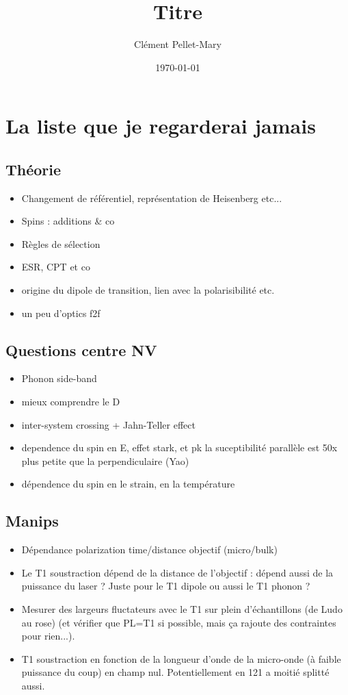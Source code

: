 \documentclass[a4paper]{report}
\title{Titre}
\author{Clément Pellet-Mary}
\date\today
\begin{document}
\chapter{La liste que je regarderai jamais}
  \section{Théorie}
  \begin{itemize}
  \item Changement de référentiel, représentation de Heisenberg etc...
  \item Spins : additions \& co
  \item Règles de sélection
  \item ESR, CPT et co
  \item origine du dipole de transition, lien avec la polarisibilité etc.
  \item un peu d'optics f2f
  \end{itemize}
  \section{Questions centre NV}
  \begin{itemize}
  \item Phonon side-band
  \item mieux comprendre le D
  \item inter-system crossing + Jahn-Teller effect
  \item dependence du spin en E, effet stark, et pk la suceptibilité parallèle est 50x plus petite que la perpendiculaire (Yao)
  \item dépendence du spin en le strain, en la température
  \end{itemize}
 
 \section{Manips}
 \begin{itemize}
 \item Dépendance polarization time/distance objectif (micro/bulk)
 \item Le T1 soustraction dépend de la distance de l'objectif : dépend aussi de la puissance du laser ? Juste pour le T1 dipole ou aussi le T1 phonon ?
 \item Mesurer des largeurs fluctateurs avec le T1 sur plein d'échantillons (de Ludo au rose) (et vérifier que PL=T1 si possible, mais ça rajoute des contraintes pour rien...).
 \item T1 soustraction en fonction de la longueur d'onde de la micro-onde (à faible puissance du coup) en champ nul. Potentiellement en 121 a moitié splitté aussi.
 \end{itemize}
  
\end{document}
